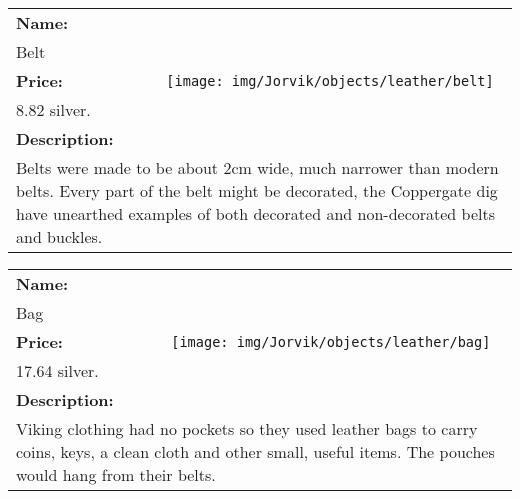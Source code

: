 \begin{table}[ht!]
	\centering
	\begin{tabular}{ p{3cm} c }\toprule
		\textbf{Name:} & \multirow{5}{*}{\texttt{[image: img/Jorvik/objects/leather/belt]}}\\
		Belt & \\ 
		\textbf{Price:} & \\
		8.82 silver. & \\ 
		\textbf{Description:} & \\
		\multicolumn{2}{p{12cm}}{Belts were made to be about 2cm wide, much narrower than modern belts. Every part of the belt might be decorated, the Coppergate dig have unearthed examples of both decorated and non-decorated belts and buckles.}\\
		\bottomrule
	\end{tabular}
\end{table}

\begin{table}[ht!]
	\centering
	\begin{tabular}{ p{3cm} c }\toprule
		\textbf{Name:} & \multirow{5}{*}{\texttt{[image: img/Jorvik/objects/leather/bag]}}\\
		Bag & \\ 
		\textbf{Price:} & \\
		17.64 silver. & \\ 
		\textbf{Description:} & \\
		\multicolumn{2}{p{12cm}}{Viking clothing had no pockets so they used leather bags to carry coins, keys, a clean cloth and other small, useful items. The pouches would hang from their belts.}\\
		\bottomrule
	\end{tabular}
\end{table}